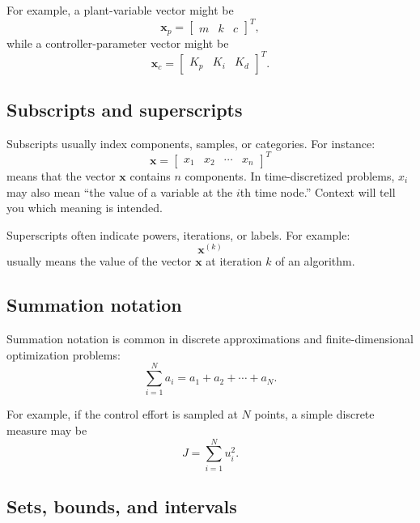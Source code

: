 \documentclass[11pt]{article}
\newcommand{\vect}[1]{\boldsymbol{#1}}
\newcommand{\xp}{\vect{x}_p}
\newcommand{\xc}{\vect{x}_c}
\newcommand{\xstate}{\vect{x}}
\begin{document}
For example, a plant-variable vector might be
\begin{equation}
\xp = \begin{bmatrix} m & k & c \end{bmatrix}^{T},
\end{equation}
while a controller-parameter vector might be
\begin{equation}
\xc = \begin{bmatrix} K_p & K_i & K_d \end{bmatrix}^{T}.
\end{equation}

\subsection{Subscripts and superscripts}

Subscripts usually index components, samples, or categories. For instance:
\begin{equation}
\xstate = \begin{bmatrix} x_1 & x_2 & \cdots & x_n \end{bmatrix}^{T}
\end{equation}
means that the vector $\xstate$ contains $n$ components. In time-discretized problems, $x_i$ may also mean ``the value of a variable at the $i$th time node.'' Context will tell you which meaning is intended.

Superscripts often indicate powers, iterations, or labels. For example:
\begin{equation}
\xstate^{(k)}
\end{equation}
usually means the value of the vector $\xstate$ at iteration $k$ of an algorithm.

\subsection{Summation notation}

Summation notation is common in discrete approximations and finite-dimensional optimization problems:
\begin{equation}
\sum_{i=1}^{N} a_i = a_1 + a_2 + \cdots + a_N.
\end{equation}

For example, if the control effort is sampled at $N$ points, a simple discrete measure may be
\begin{equation}
J = \sum_{i=1}^{N} u_i^2.
\end{equation}

\subsection{Sets, bounds, and intervals}
\end{document}
